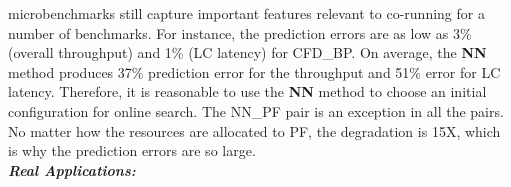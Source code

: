 microbenchmarks still capture important features relevant to co-running for a number of
benchmarks. For instance, the prediction errors are as low as 3\% (overall throughput) and 1\% (LC latency) for
CFD\_BP. %
On average, the \textbf{NN} method produces 37\% prediction error for the %
throughput and 51\% error for LC latency. %
Therefore, it is reasonable to use the 
\textbf{NN} method to choose an initial configuration for online search. %
The NN\_PF pair is an exception in all the pairs. %
No matter how the resources are allocated to PF, the degradation is 15X,
which is why the prediction errors %
are so large.\\%
\textbf{\textit{Real Applications:}}
